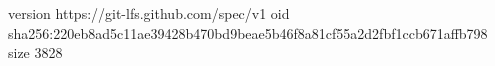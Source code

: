 version https://git-lfs.github.com/spec/v1
oid sha256:220eb8ad5c11ae39428b470bd9beae5b46f8a81cf55a2d2fbf1ccb671affb798
size 3828
